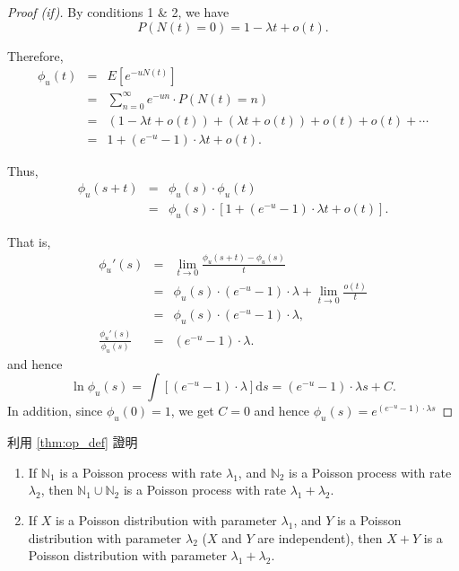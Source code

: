 \begin{theorem}[操作型定義]
\begin{proof}[Proof (if)]
By conditions 1 \& 2, we have
\[ P(N(t) = 0) = 1 - \lambda t + o(t). \]

Therefore,
\begin{eqnarray*}
\phi_{u}(t)
  & = & E[e^{-uN(t)}] \\
  & = & \sum_{n = 0}^{\infty} e^{-un} \cdot P(N(t) = n) \\
  & = & (1 - \lambda t + o(t)) + (\lambda t + o(t)) + o(t) + o(t) + \cdots \\
  & = & 1 + (e^{-u} - 1) \cdot \lambda t + o(t).
\end{eqnarray*}

Thus,
\begin{eqnarray*}
\phi_{u}(s + t)
  & = & \phi_{u}(s) \cdot \phi_{u}(t) \\
  & = & \phi_{u}(s) \cdot [1 + (e^{-u} - 1) \cdot \lambda t + o(t)].
\end{eqnarray*}

That is,
\begin{eqnarray*}
\phi_{u}'(s)
  & = & \lim_{t \to 0} \frac{\phi_{u}(s + t) - \phi_{u}(s)}{t} \\
  & = & \phi_{u}(s) \cdot (e^{-u} - 1) \cdot \lambda + \lim_{t \to 0} \frac{o(t)}{t} \\
  & = & \phi_{u}(s) \cdot (e^{-u} - 1) \cdot \lambda, \\
\frac{\phi_{u}'(s)}{\phi_{u}(s)}
  & = & (e^{-u} - 1) \cdot \lambda.
\end{eqnarray*}
and hence
\[ \ln \phi_{u}(s) = \int [(e^{-u} - 1) \cdot \lambda] \mathrm{d} s = (e^{-u} - 1) \cdot \lambda s + C. \]
In addition, since $ \phi_{u}(0) = 1 $, we get $ C = 0 $ and hence $ \phi_{u}(s) = e^{(e^{-u} - 1) \cdot \lambda s} $
\end{proof}
\end{theorem}

\begin{exercise}
利用 \autoref{thm:op_def} 證明
\begin{enumerate}
  \item If $ \mathbb{N}_{1} $ is a Poisson process with rate $ \lambda_{1} $, and $ \mathbb{N}_{2} $ is a Poisson process with rate $ \lambda_{2} $, then $ \mathbb{N}_{1} \cup \mathbb{N}_{2} $ is a Poisson process with rate $ \lambda_{1} + \lambda_{2} $.
  \item If $ X $ is a Poisson distribution with parameter $ \lambda_{1} $, and $ Y $ is a Poisson distribution with parameter $ \lambda_{2} $ ($ X $ and $ Y $ are independent), then $ X+Y $ is a Poisson distribution with parameter $ \lambda_{1} + \lambda_{2} $.
\end{enumerate}
\end{exercise}
